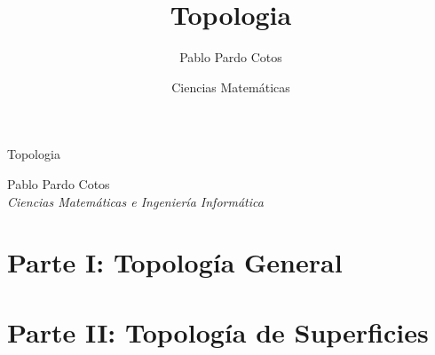 \documentclass[a4paper,11pt,final]{article}
\title{Topologia}
\date{Ciencias Matemáticas}
\author{Pablo Pardo Cotos}
\begin{document}
\begin{titlepage}
    \centering\Large\null\vfill

    {\Huge Topologia}\\ 
    \vspace{1em}

    \vskip8cm

    Pablo Pardo Cotos\\

    \emph{Ciencias Matemáticas e Ingeniería Informática}\\
    \vskip4cm
\end{titlepage}

\newpage
\pagestyle{plain}    
\tableofcontents
\newpage

\section*{Parte I: Topología General}


\newpage

\newpage

\newpage

\newpage

\newpage

\section*{Parte II: Topología de Superficies}


\newpage

\end{document}
